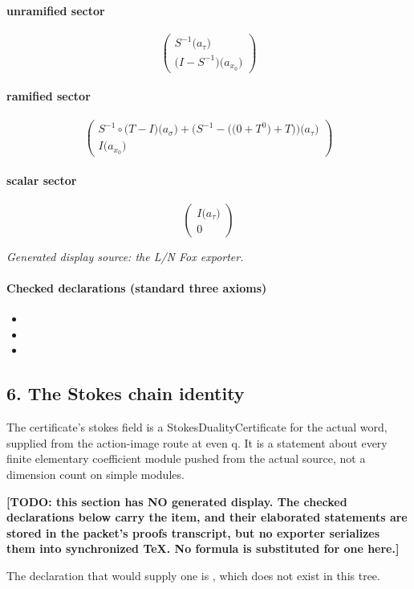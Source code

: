\paragraph{unramified sector}
\[\begin{pmatrix}S^{-1}\bigl(a_{\tau}\bigr)\\\bigl(I-S^{-1}\bigr)\bigl(a_{x_{0}}\bigr)\end{pmatrix}\]
\paragraph{ramified sector}
\[\begin{pmatrix}S^{-1}\circ \bigl(T-I\bigr)\bigl(a_{\sigma}\bigr)+\bigl(S^{-1}-\bigl(\bigl(0+T^{0}\bigr)+T\bigr)\bigr)\bigl(a_{\tau}\bigr)\\I\bigl(a_{x_{0}}\bigr)\end{pmatrix}\]
\paragraph{scalar sector}
\[\begin{pmatrix}I\bigl(a_{\tau}\bigr)\\0\end{pmatrix}\]
\par\noindent\emph{Generated display source: the L/N Fox exporter.}
\paragraph{Checked declarations (standard three axioms)}
\begin{itemize}
\item {}
\item {}
\item {}
\end{itemize}

\subsection*{6. The Stokes chain identity}
The certificate's stokes field is a StokesDualityCertificate for the actual word, supplied from the action-image route at even q. It is a statement about every finite elementary coefficient module pushed from the actual source, not a dimension count on simple modules.

\par\noindent\textbf{[TODO: this section has NO generated display. The checked declarations below carry the item, and their elaborated statements are stored in the packet's proofs transcript, but no exporter serializes them into synchronized TeX. No formula is substituted for one here.]}
\par\noindent The declaration that would supply one is , which does not exist in this tree.

